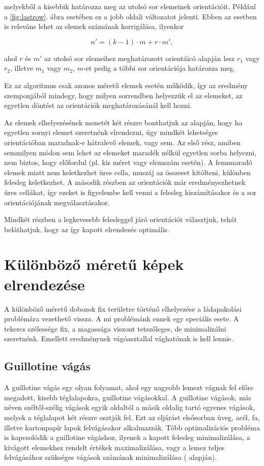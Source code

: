 \noindent melyekből a kisebbik határozza meg az utolsó sor elemeinek orientációit. Például a \ref{fig:lastrow}. ábra esetében ez a jobb oldali változatot jelenti. Ebben az esetben is releváns lehet az elemek számának korrigálása, ilyenkor

$$n' = (k - 1) \cdot m + r \cdot m',$$ 

\noindent ahol $r$ és $m'$ az utolsó sor elemeihez meghatározott orientáicó alapján lesz $r_1$ vagy $r_2$, illetve $m_1$ vagy $m_2$, $m$-et pedig a többi sor orientációja határozza meg.

Ez az algoritmus csak azonos méretű elemek esetén működik, így az eredmény szemponjából mindegy, hogy milyen sorrendben helyezzük el az elemeket, az egyetlen döntést az orientációk meghatározásánál kell hozni.

\newpage

Az elemek elhelyezésének menetét két részre bonthatjuk az alapján, hogy ha egyetlen sornyi elemet szeretnénk elrendezni, úgy mindkét lehetséges orientációban maradnak-e hátralevő elemek, vagy sem. Az első rész, amiben semmilyen módon sem lehet az elemeket maradék nélkül egyetlen sorba helyezni, nem biztos, hogy előfordul (pl. kis méret vagy elemszám esetén). A fennmaradó elemek miatt nem keletkezhet üres cella, muszáj az összeset kitölteni, különben felesleg keletkezhet. A második részben az orientációk már eredményezhetnek üres cellákat, így ezeket is figyelembe kell venni a felesleg kiszámításakor és a sor orientációjának megválasztásakor.

Mindkét részben a legkevesebb felesleggel járó orientációt választjuk, tehát beláthatjuk, hogy az így kapott elrendezés optimális.

\section{Különböző méretű képek elrendezése}

A különböző méretű dobozok fix területre történő elhelyezése a ládapakolási problémára vezethető vissza. A mi problémánk ennek egy speciális esete. A tekercs szélessége fix, a magassága viszont tetszőleges, de minimalizálni szeretnénk. Emellett eredménynek vágóasztallal vághatónak is kell lennie.

\subsection{Guillotine vágás}

A guillotine vágás egy olyan folyamat, ahol egy nagyobb lemezt vágnak fel előre megadott, kisebb téglalapokra, guillotine vágásokkal. A guillotine vágások, más néven széltől-szélig vágások egyik oldaltól a másik oldalig tartó egyenes vágások, melyek a téglalapot két részre osztják fel. 
Ezt az eljárást elsősorban üveg, acél, fa, illetve kartonpapír lapok felvágásakor alkalmazzák. Több optimalizációs probléma is kapcsolódik a guillotine vágáshoz, ilyenek a kapott felesleg minimalizálása, a kivágott elemekhez rendelt értékek maximalizálása, vagy a lemez teljes felvágásához szükséges vágások számának minimalizálása (\cite{guillotine-cutting-wiki} alapján). 

